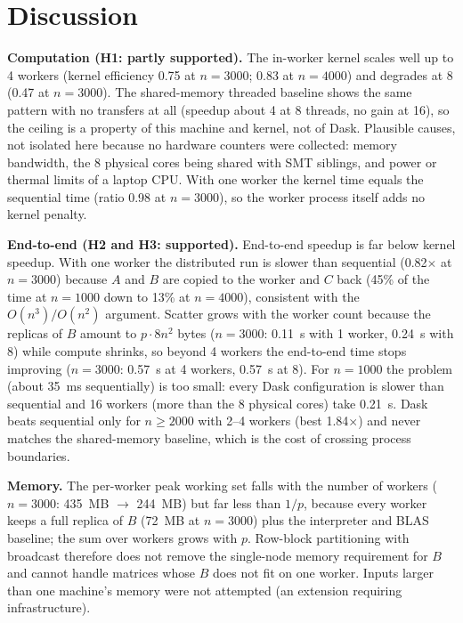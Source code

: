 \documentclass[10pt,a4paper]{article}
\begin{document}
\section{Discussion}
\textbf{Computation (H1: partly supported).} The in-worker kernel scales well up to 4 workers (kernel efficiency 0.75 at $n=3000$; 0.83 at $n=4000$) and degrades at 8 (0.47 at $n=3000$). The shared-memory threaded baseline shows the same pattern with no transfers at all (speedup about 4 at 8 threads, no gain at 16), so the ceiling is a property of this machine and kernel, not of Dask. Plausible causes, not isolated here because no hardware counters were collected: memory bandwidth, the 8 physical cores being shared with SMT siblings, and power or thermal limits of a laptop CPU. With one worker the kernel time equals the sequential time (ratio 0.98 at $n=3000$), so the worker process itself adds no kernel penalty.

\textbf{End-to-end (H2 and H3: supported).} End-to-end speedup is far below kernel speedup. With one worker the distributed run is slower than sequential (0.82$\times$ at $n=3000$) because $A$ and $B$ are copied to the worker and $C$ back (45\% of the time at $n=1000$ down to 13\% at $n=4000$), consistent with the $O(n^3)/O(n^2)$ argument. Scatter grows with the worker count because the replicas of $B$ amount to $p\cdot8n^2$ bytes ($n=3000$: 0.11~s with 1 worker, 0.24~s with 8) while compute shrinks, so beyond 4 workers the end-to-end time stops improving ($n=3000$: 0.57~s at 4 workers, 0.57~s at 8). For $n=1000$ the problem (about 35~ms sequentially) is too small: every Dask configuration is slower than sequential and 16 workers (more than the 8 physical cores) take 0.21~s. Dask beats sequential only for $n\ge2000$ with 2--4 workers (best 1.84$\times$) and never matches the shared-memory baseline, which is the cost of crossing process boundaries.

\textbf{Memory.} The per-worker peak working set falls with the number of workers ($n=3000$: 435~MB $\rightarrow$ 244~MB) but far less than $1/p$, because every worker keeps a full replica of $B$ (72~MB at $n=3000$) plus the interpreter and BLAS baseline; the sum over workers grows with $p$. Row-block partitioning with broadcast therefore does not remove the single-node memory requirement for $B$ and cannot handle matrices whose $B$ does not fit on one worker. Inputs larger than one machine's memory were not attempted (an extension requiring infrastructure).
\end{document}
